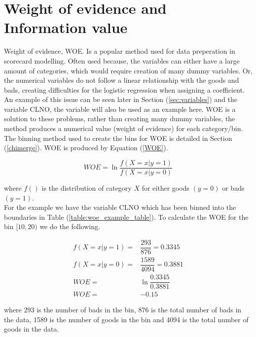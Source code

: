 \pagebreak

\section{Weight of evidence and Information value}  \label{sec:woe_and_iv}

Weight of evidence, WOE. Is a popular method used for data preperation in scorecard modelling. Often used because, the variables can either have a large amount of categories, which would require creation of many dummy variables. Or, the numerical variables do not follow a linear relationship with the goods and bads, creating difficulties for the logistic regression when assigning a coefficient. An example of this issue can be seen later in Section (\ref{sec:variables}) and the variable CLNO, the variable will also be used as an example here. WOE is a solution to these problems, rather than creating many dummy variables, the method produces a numerical value (weight of evidence) for each category/bin. The binning method used to create the bins for WOE is detailed in Section (\ref{chimerge}). WOE is produced by Equation (\ref{WOE}). 

\begin{equation}\label{WOE}
WOE = \ln \frac{f(X=x|y=1)}{f(X=x|y=0)}
\end{equation}

where $f()$ is the distribution of category $X$ for either goods $(y=0)$ or bads $(y=1)$. \\

For the example we have the variable CLNO which has been binned into the boundaries in Table (\ref{table:woe_example_table}). To calculate the WOE for the bin $[10, 20)$ we do the following. 

\begin{equation}\label{WOE_Example}
\begin{aligned}
f(X=x|y=1) =& \dfrac{293}{876} = 0.3345 \\
f(X=x|y=0) =& \dfrac{1589}{4094} = 0.3881 \\
WOE =& \ln \dfrac{0.3345}{0.3881} \\
WOE =& -0.15
\end{aligned}
\end{equation}

where 293 is the number of bads in the bin, 876 is the total number of bads in the data, 1589 is the number of goods in the bin and 4094 is the total number of goods in the data. \\

